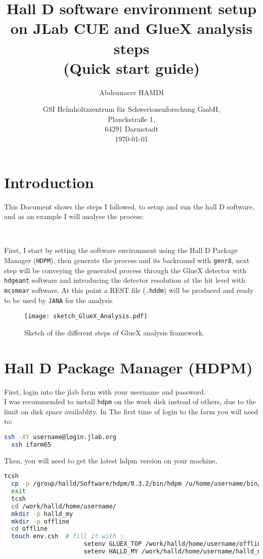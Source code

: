 \documentclass{article}
\title{Hall D software environment setup on JLab CUE and GlueX analysis steps \\ (Quick start guide)}
\author{Abdennacer HAMDI}
\date{%
GSI Helmholtzzentrum f\"ur Schwerionenforschung GmbH,\\%
Planckstraße 1,\\%
64291 Darmstadt \\%
\today}
\begin{document}
\fontsize{11}{11}
\selectfont
\maketitle

\section{Introduction}
This Document shows the steps I followed, to setup and run the hall D software, and as an example I will analyse the process: 

\begin{center}
\end{center}

~\par First, I start by setting the software environment using the Hall D Package Manager (\texttt{HDPM}), then generate the process and its backround with \texttt{genr8}, next step will be conveying the generated process through the GlueX detector with \texttt{hdgeant} software and introducing the detector resolution at the hit level with \texttt{mcsmear} software. At this point a REST file (\texttt{.hddm}) will be produced and ready to be used by \texttt{JANA} for the analysis %

\begin{figure}[h]
  \centering
  \texttt{[image: sketch\_GlueX\_Analysis.pdf]}
  \caption{Sketch of the different steps of GlueX analysis framework.}
  \label{fig:1}
\end{figure}

\section{Hall D Package Manager (HDPM)}

First, login into the jlab farm with your username and password.\\
I was recommended to install \texttt{hdpm} on the work disk instead of others, due to the limit on disk space availablity.
In The first time of login to the farm you will need to:

\begin{lstlisting}[language=bash]
  ssh -XY username@login.jlab.org
  ssh ifarm65
\end{lstlisting} 

Then, you will need to get the latest hdpm version on your machine,
\begin{lstlisting}[language=bash]
  tcsh 
  cp -p /group/halld/Software/hdpm/0.3.2/bin/hdpm /u/home/username/bin/  # only first time to update hdpm
  exit
  tcsh
  cd /work/halld/home/username/
  mkdir -p halld_my
  mkdir -p offline
  cd offline
  touch env.csh  # fill it with :
                      setenv GLUEX_TOP /work/halld/home/username/offline
                      setenv HALLD_MY /work/halld/home/username/halld_my
\end{lstlisting}
\end{document}
